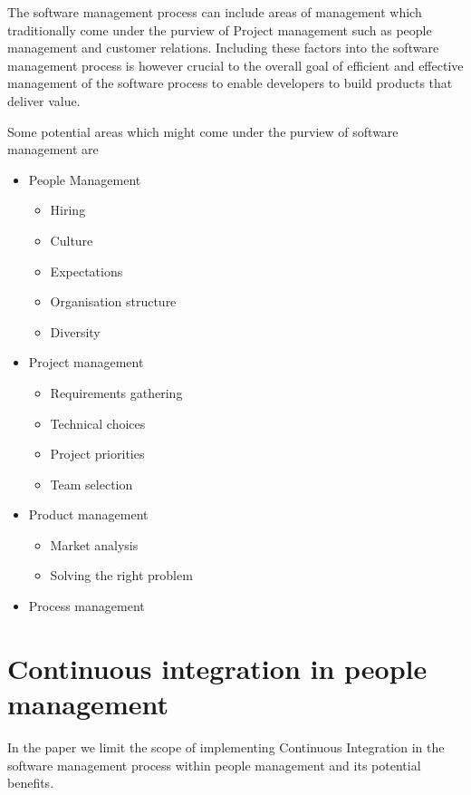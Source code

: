 \documentclass[12pt,conference]{IEEEtran}
\begin{document}
The software management process can include areas of management which traditionally come under the purview of Project management such as people management and customer relations. Including these factors into the software management process is however crucial to the overall goal of efficient and effective management of the software process to enable developers to build products that deliver value.

Some potential areas which might come under the purview of software management are

\begin{itemize}

\item People Management
\begin{itemize}
\item Hiring
\item Culture
\item Expectations
\item Organisation structure
\item Diversity
\end{itemize}

\item Project management
\begin{itemize}
\item Requirements gathering
\item Technical choices
\item Project priorities
\item Team selection
\end{itemize}

\item Product management
\begin{itemize}
\item Market analysis
\item Solving the right problem
\end{itemize}

\item Process management
\end{itemize}


\section*{Continuous integration in people management}

In the paper we limit the scope of implementing Continuous Integration in the software management process within people management and its potential benefits.
\end{document}
